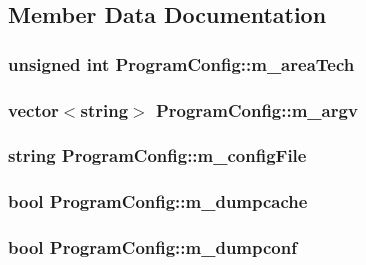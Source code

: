 \subsection{Member Data Documentation}
\hypertarget{struct_program_config_ab1c91eb479c4bd7b09a2043c26b6327c}{
\subsubsection[{m\+\_\+area\+Tech}]{\setlength{\rightskip}{0pt plus 5cm}unsigned int Program\+Config\+::m\+\_\+area\+Tech}}\label{struct_program_config_ab1c91eb479c4bd7b09a2043c26b6327c}
\hypertarget{struct_program_config_a790c5c5dac05965fa5c0bc05d15974df}{
\subsubsection[{m\+\_\+argv}]{\setlength{\rightskip}{0pt plus 5cm}vector$<$string$>$ Program\+Config\+::m\+\_\+argv}}\label{struct_program_config_a790c5c5dac05965fa5c0bc05d15974df}
\hypertarget{struct_program_config_ae852d51870a2d088c1897dc247a3e5fa}{
\subsubsection[{m\+\_\+config\+File}]{\setlength{\rightskip}{0pt plus 5cm}string Program\+Config\+::m\+\_\+config\+File}}\label{struct_program_config_ae852d51870a2d088c1897dc247a3e5fa}
\hypertarget{struct_program_config_a1819ec3da31552f2b7609542063dc78c}{
\subsubsection[{m\+\_\+dumpcache}]{\setlength{\rightskip}{0pt plus 5cm}bool Program\+Config\+::m\+\_\+dumpcache}}\label{struct_program_config_a1819ec3da31552f2b7609542063dc78c}
\hypertarget{struct_program_config_a2fd70e02cadefc09089610222479cc5f}{
\subsubsection[{m\+\_\+dumpconf}]{\setlength{\rightskip}{0pt plus 5cm}bool Program\+Config\+::m\+\_\+dumpconf}}\label{struct_program_config_a2fd70e02cadefc09089610222479cc5f}
